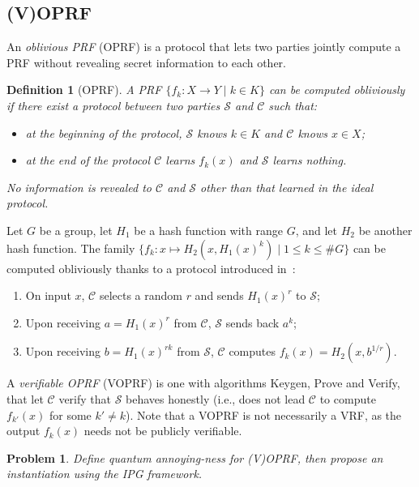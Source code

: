 \documentclass{article}
\newtheorem{prob}[ex]{Problem}
\newtheorem{defi}{Definition}
\begin{document}
\subsection{(V)OPRF}
\label{sec:voprf}

An \emph{oblivious PRF} (OPRF) is a protocol that lets two parties
jointly compute a PRF without revealing secret information to each
other.

\begin{defi}[OPRF]
  A PRF $\{f_k: X\to Y \;|\; k\in K\}$ can be computed
  \emph{obliviously} if there exist a protocol between two parties
  $\mathcal{S}$ and $\mathcal{C}$ such that:
  \begin{itemize}
  \item at the beginning of the protocol, $\mathcal{S}$ knows $k\in K$ and
    $\mathcal{C}$ knows $x\in X$;
  \item at the end of the protocol $\mathcal{C}$ learns $f_k(x)$ and
    $\mathcal{S}$ learns nothing.
  \end{itemize}
  No information is revealed to $\mathcal{C}$ and $\mathcal{S}$ other
  than that learned in the ideal protocol.
\end{defi}

Let $G$ be a group, let $H_1$ be a hash function with range $G$, and
let $H_2$ be another hash function.  The family
$\{f_k : x\mapsto H_2(x,H_1(x)^k) \;|\; 1\le k\le \#G \}$ can be
computed obliviously thanks to a protocol introduced
in~\cite{jarecki2016highly}:
\begin{enumerate}
\item On input $x$, $\mathcal{C}$ selects a random $r$ and sends
  $H_1(x)^r$ to $\mathcal{S}$;
\item Upon receiving $a=H_1(x)^r$ from $\mathcal{C}$, $\mathcal{S}$ sends
  back $a^k$;
\item Upon receiving $b = H_1(x)^{rk}$ from $\mathcal{S}$,
  $\mathcal{C}$ computes $f_k(x) = H_2(x, b^{1/r})$.
\end{enumerate}

A \emph{verifiable OPRF} (VOPRF) is one with algorithms Keygen, Prove
and Verify, that let $\mathcal{C}$ verify that $\mathcal{S}$ behaves
honestly (i.e., does not lead $\mathcal{C}$ to compute $f_{k'}(x)$ for
some $k'\ne k$).  Note that a VOPRF is not necessarily a VRF, as the
output $f_k(x)$ needs not be publicly verifiable.

\begin{prob}
  Define quantum annoying-ness for (V)OPRF, then propose an
  instantiation using the IPG framework.
\end{prob}
\end{document}
